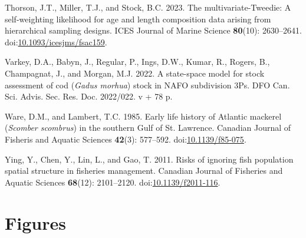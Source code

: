 \documentclass[
]{article}
\newlength{\cslhangindent}
\newlength{\cslentryspacingunit} %
\newenvironment{CSLReferences}[2] %
 {%
  \setlength{\parindent}{0pt}
  \ifodd #1
  \let\oldpar\par
  \def\par{\hangindent=\cslhangindent\oldpar}
  \fi
  \setlength{\parskip}{#2\cslentryspacingunit}
 }%
 {}
\begin{document}
\begin{CSLReferences}{1}{0}
\leavevmode{}%
Thorson, J.T., Miller, T.J., and Stock, B.C. 2023. The multivariate-{T}weedie: A self-weighting likelihood for age and length composition data arising from hierarchical sampling designs. ICES Journal of Marine Science \textbf{80}(10): 2630--2641. doi:\href{https://doi.org/10.1093/icesjms/fsac159}{10.1093/icesjms/fsac159}.

\leavevmode{}%
Varkey, D.A., Babyn, J., Regular, P., Ings, D.W., Kumar, R., Rogers, B., Champagnat, J., and Morgan, M.J. 2022. A state-space model for stock assessment of cod (\emph{{G}adus morhua}) stock in NAFO subdivision 3Ps. {DFO} {Can.} {Sci.} {Advis.} {Sec.} {Res.} {Doc.} 2022/022. v + 78 p.

\leavevmode{}%
Ware, D.M., and Lambert, T.C. 1985. Early life history of {A}tlantic mackerel (\emph{{S}comber scombrus}) in the southern {G}ulf of {S}t. {L}awrence. Canadian Journal of Fisheris and Aquatic Sciences \textbf{42}(3): 577--592. doi:\href{https://doi.org/10.1139/f85-075}{10.1139/f85-075}.

\leavevmode{}%
Ying, Y., Chen, Y., Lin, L., and Gao, T. 2011. Risks of ignoring fish population spatial structure in fisheries management. Canadian Journal of Fisheries and Aquatic Sciences \textbf{68}(12): 2101--2120. doi:\href{https://doi.org/10.1139/f2011-116}{10.1139/f2011-116}.

\end{CSLReferences}

\pagebreak

\pagebreak

\hypertarget{figures}{%
\section*{Figures}\label{figures}}
\end{document}

